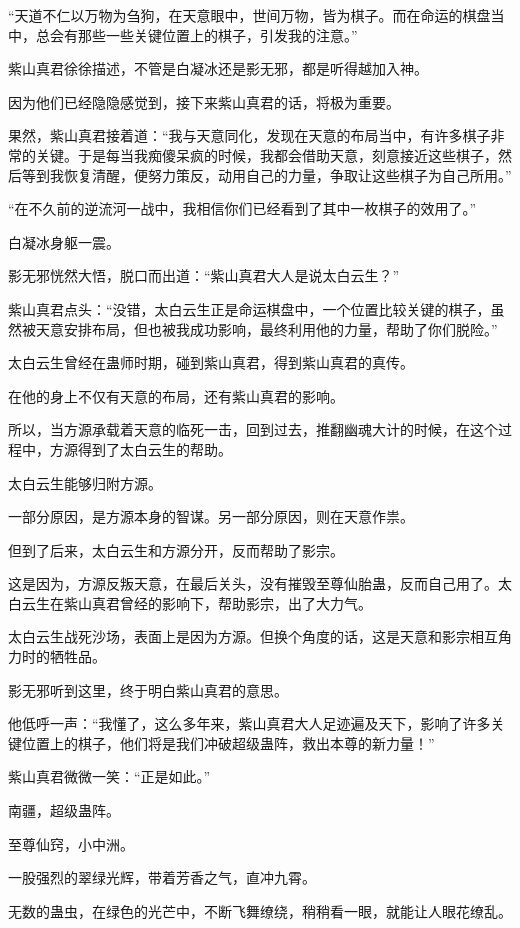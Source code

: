 \begin{this_body}
“天道不仁以万物为刍狗，在天意眼中，世间万物，皆为棋子。而在命运的棋盘当中，总会有那些一些关键位置上的棋子，引发我的注意。”

紫山真君徐徐描述，不管是白凝冰还是影无邪，都是听得越加入神。

因为他们已经隐隐感觉到，接下来紫山真君的话，将极为重要。

果然，紫山真君接着道：“我与天意同化，发现在天意的布局当中，有许多棋子非常的关键。于是每当我痴傻呆疯的时候，我都会借助天意，刻意接近这些棋子，然后等到我恢复清醒，便努力策反，动用自己的力量，争取让这些棋子为自己所用。”

“在不久前的逆流河一战中，我相信你们已经看到了其中一枚棋子的效用了。”

白凝冰身躯一震。

影无邪恍然大悟，脱口而出道：“紫山真君大人是说太白云生？”

紫山真君点头：“没错，太白云生正是命运棋盘中，一个位置比较关键的棋子，虽然被天意安排布局，但也被我成功影响，最终利用他的力量，帮助了你们脱险。”

太白云生曾经在蛊师时期，碰到紫山真君，得到紫山真君的真传。

在他的身上不仅有天意的布局，还有紫山真君的影响。

所以，当方源承载着天意的临死一击，回到过去，推翻幽魂大计的时候，在这个过程中，方源得到了太白云生的帮助。

太白云生能够归附方源。

一部分原因，是方源本身的智谋。另一部分原因，则在天意作祟。

但到了后来，太白云生和方源分开，反而帮助了影宗。

这是因为，方源反叛天意，在最后关头，没有摧毁至尊仙胎蛊，反而自己用了。太白云生在紫山真君曾经的影响下，帮助影宗，出了大力气。

太白云生战死沙场，表面上是因为方源。但换个角度的话，这是天意和影宗相互角力时的牺牲品。

影无邪听到这里，终于明白紫山真君的意思。

他低呼一声：“我懂了，这么多年来，紫山真君大人足迹遍及天下，影响了许多关键位置上的棋子，他们将是我们冲破超级蛊阵，救出本尊的新力量！”

紫山真君微微一笑：“正是如此。”

南疆，超级蛊阵。

至尊仙窍，小中洲。

一股强烈的翠绿光辉，带着芳香之气，直冲九霄。

无数的蛊虫，在绿色的光芒中，不断飞舞缭绕，稍稍看一眼，就能让人眼花缭乱。


\end{this_body}

